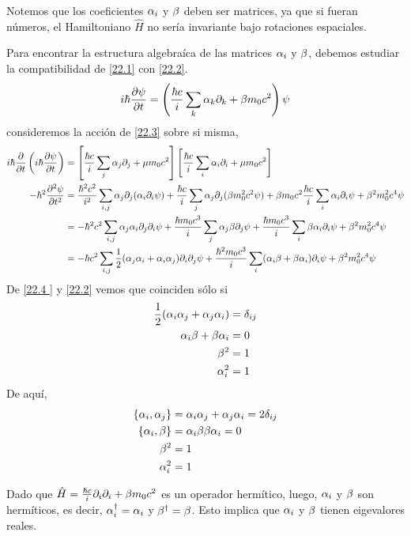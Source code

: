 Notemos que los coeficientes $\alpha_i $ y $\beta$ deben ser matrices, ya que si fueran números, el Hamiltoniano $\hat{H}$ no sería invariante bajo rotaciones espaciales.

Para encontrar la estructura algebraíca de las matrices $\alpha_i$ y $\beta$, debemos estudiar la compatibilidad de \eqref{22.1} con \eqref{22.2}.
\begin{equation}\label{22.3}
  i\hbar\pdv{\psi}{t}=\left(\frac{\hbar c}{i}\sum_k\alpha_k\partial_k+\beta m_0c^2\right)\psi
\end{equation}
consideremos la acción de \eqref{22.3} sobre si misma,
\begin{align}
  \nonumber i\hbar\pdv{t}\left(i\hbar\pdv{\psi}{t}\right)&=\left[\frac{\hbar c}{i}\sum_j\alpha_j\partial_j+\mu m_0c^2\right]\left[\frac{\hbar c}{i}\sum_i\alpha_i\partial_i+\mu m_0c^2\right]\\
 \nonumber -\hbar^2\pdv[2]{\psi}{t}&=\frac{\hbar^2c^2}{i^2}\sum_{i,j}\alpha_j\partial_j(\alpha_i\partial_i\psi)+\frac{\hbar c}{i}\sum_j\alpha_j\partial_j(\beta m_0^2c^2\psi)+ \beta m_0c^2\frac{\hbar c}{i}\sum_i\alpha_i\partial_i\psi +\beta^2m_0^2c^4\psi\\
  \nonumber &=-\hbar^2c^2\sum_{i,j}\alpha_j\alpha_i\partial_j\partial_i\psi+\frac{\hbar m_0c^3}{i}\sum_j\alpha_j\beta \partial_j \psi+\frac{\hbar m_0c^3}{i}\sum_i\beta\alpha_i\partial_i\psi+\beta^2m_0^2c^4\psi\\
  &=-\hbar c^2\sum_{i,j}\frac{1}{2}(\alpha_j\alpha_i+\alpha_i\alpha_j)\partial_i\partial_j\psi+\frac{\hbar^2m_0c^3}{i}\sum_i(\alpha_i\beta +\beta \alpha_i)\partial_i\psi +\beta^2m_0^2c^4\psi\label{22.4 }
\end{align}
De \eqref{22.4 } y \eqref{22.2} vemos que coinciden sólo si
\begin{align*}
  \frac{1}{2}(\alpha_i\alpha_j+\alpha_j\alpha_i)&=\delta_{ij}\\
  \alpha_i\beta +\beta \alpha_i&=0\\
  \beta^2&=1\\
  \alpha_i ^2&=1
\end{align*}
De aquí,
\begin{equation}\label{22.5}
\begin{split}
  \{\alpha_i,\alpha_j\}&=\alpha_i\alpha_j+\alpha_j\alpha_i=2\delta_{ij}\\
  \{\alpha_i,\beta \}&=\alpha_i\beta \beta \alpha_i=0\\
  \beta^2&=1\\
  \alpha_i^2&=1
\end{split}
\end{equation}

Dado que $\hat{H}=\frac{\hbar c}{i}\partial_i\partial_i+\beta m_0c^2$ es un operador hermítico, luego, $\alpha_i$ y $\beta$ son hermíticos, es decir, $\alpha_i^\dagger=\alpha_i$ y $\beta^\dagger=\beta $. Esto implica que $\alpha_i$ y $\beta$ tienen eigevalores reales.

